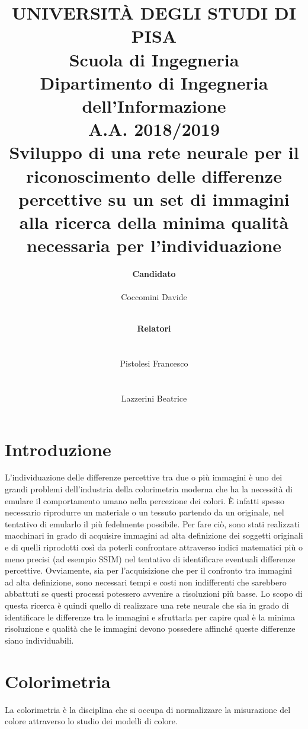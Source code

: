 \documentclass[a4paper,11pt]{article}
\author{
        \rule{0in}{0pt}\textbf{\Large Candidato} \\
        \rule{0in}{0pt}Coccomini Davide \\
        \and
        \rule{1.5in}{0pt}\textbf{\Large Relatori}\\
        \rule{1.5in}{0pt}Pistolesi Francesco\\
        \rule{1.5in}{0pt}Lazzerini Beatrice \\
    }
\title{\textbf{UNIVERSITÀ DEGLI STUDI DI PISA} \\[0.4in]
    Scuola di Ingegneria \\
    Dipartimento di Ingegneria dell’Informazione \\
    A.A. 2018/2019\\[0.7in]
    Sviluppo di una rete neurale per il riconoscimento delle differenze percettive su un set di immagini alla ricerca della minima qualità necessaria per l'individuazione\\[0.8in]}
\date{}
\begin{document}
    \pagestyle{fancy}
    \fancyhead{} 
    \renewcommand{\headrulewidth}{0pt}
    \fancyfoot{}
    \fancyfoot[LE,RO]{\thepage}    
    \renewcommand{\footrulewidth}{0.4pt}
    \maketitle
    \newpage
        \tableofcontents
        \newpage
        \section{Introduzione}
        L'individuazione delle differenze percettive tra due o più immagini è uno dei grandi problemi dell'industria della colorimetria moderna che ha la necessità di emulare il 
        comportamento umano nella percezione dei colori. È infatti spesso necessario riprodurre un materiale o un tessuto partendo da un originale, nel tentativo di emularlo il più fedelmente possibile. 
        Per fare ciò, sono stati realizzati macchinari in grado di acquisire immagini ad alta definizione dei soggetti originali e di quelli riprodotti così da poterli confrontare attraverso indici matematici più o meno precisi (ad esempio SSIM) 
        nel tentativo di identificare eventuali differenze percettive. Ovviamente, sia per l'acquisizione che per il confronto tra immagini ad alta definizione, sono necessari tempi e costi non indifferenti che sarebbero abbattuti se questi processi potessero avvenire a risoluzioni più basse.
        Lo scopo di questa ricerca è quindi quello di realizzare una rete neurale che sia in grado di identificare le differenze tra le immagini e sfruttarla per capire qual è la minima risoluzione e qualità che le immagini devono possedere affinché queste differenze siano individuabili.
    
        \newpage
        \section{Colorimetria}
        La colorimetria è la disciplina che si occupa di normalizzare la misurazione del colore attraverso lo studio dei modelli di colore.
\end{document}
